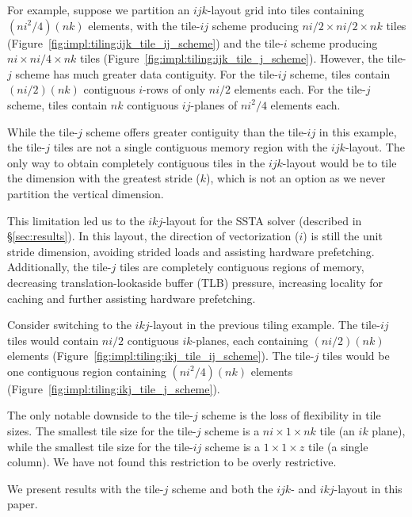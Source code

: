 \documentclass[10pt, conference, compsocconf]{IEEEtran}
\begin{document}
For example, suppose we partition an \(ijk\)-layout grid into tiles containing
  \((ni^2/4)(nk)\) elements, with the tile-\(ij\) scheme producing
  \(ni/2 \times ni/2 \times nk\) tiles
  (Figure~\ref{fig:impl:tiling:ijk_tile_ij_scheme})
  and the tile-\(i\) scheme producing
  \(ni \times ni/4 \times nk\) tiles
  (Figure~\ref{fig:impl:tiling:ijk_tile_j_scheme}).
However, the tile-\(j\) scheme has much greater data contiguity.
For the tile-\(ij\) scheme, tiles contain \((ni/2)(nk)\) contiguous
  \(i\)-rows of only \(ni/2\) elements each.
For the tile-\(j\) scheme, tiles contain \(nk\) contiguous \(ij\)-planes of
  \(ni^2/4\) elements each.

While the tile-\(j\) scheme offers greater contiguity than the
  tile-\(ij\) in this example, the tile-\(j\) tiles are not a single contiguous
  memory region with the \(ijk\)-layout.
The only way to obtain completely contiguous tiles in the \(ijk\)-layout would
  be to tile the dimension with the greatest stride (\(k\)), which is not an
  option as we never partition the vertical dimension.

This limitation led us to the \(ikj\)-layout for the SSTA solver (described
  in \S\ref{sec:results}).
In this layout, the direction of vectorization (\(i\)) is still the unit stride
  dimension, avoiding strided loads and assisting hardware prefetching.
Additionally, the tile-\(j\) tiles are completely contiguous regions of memory,
  decreasing translation-lookaside buffer (TLB) pressure, increasing locality for
  caching and further assisting hardware prefetching.

Consider switching to the \(ikj\)-layout in the previous tiling example.
The tile-\(ij\) tiles would contain \(ni/2\) contiguous \(ik\)-planes, each
  containing \((ni/2)(nk)\) elements
  (Figure~\ref{fig:impl:tiling:ikj_tile_ij_scheme}).
The tile-\(j\) tiles would be one contiguous region containing
  \((ni^2/4)(nk)\) elements
  (Figure~\ref{fig:impl:tiling:ikj_tile_j_scheme}).

The only notable downside to the tile-\(j\) scheme is the loss of
  flexibility in tile sizes.
The smallest tile size for the tile-\(j\) scheme is a \(ni \times 1 \times nk\)
  tile (an \(ik\) plane), while the smallest tile size for the
  tile-\(ij\) scheme is a \(1 \times 1 \times z\) tile (a single column).
We have not found this restriction to be overly restrictive.

We present results with the tile-\(j\) scheme and both the \(ijk\)- and
  \(ikj\)-layout in this paper.
\end{document}
